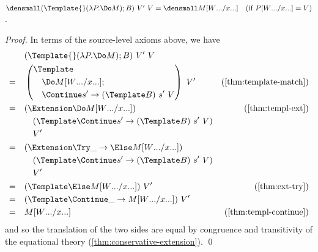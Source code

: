 \begin{lemma}
  \label{thm:template-do-match}

  $\den{(\Template{} (\lambda P. \Do M); B) ~ V' ~ V} = \den{M\subst{\many{x}}{\many{W}}}
  \quad (\text{if } P\subst{\many{x}}{\many{W}} = V)$.
\end{lemma}
\begin{proof}
  In terms of the source-level axioms above, we have
  \begin{align*}
    &\quad
    (\Template{} (\lambda P. \Do M); B) ~ V' ~ V
    \\
    =&\quad
    \left(
      \begin{aligned}
        &\Template \\
        &\quad \Do M\subst{\many{x}}{\many{W}}; \\
        &\quad \Continue s' \to (\Template B) ~ s' ~ V
      \end{aligned}
    \right)
    ~ V'
    &(\cref{thm:template-match})
    \\
    =&\quad
    \begin{aligned}[t]
      &(\Extension \Do M\subst{\many{x}}{\many{W}}) \\
      &\quad (\Template \Continue s' \to (\Template B) ~ s' ~ V) \\
      &\quad V'
    \end{aligned}
    &(\cref{thm:templ-ext})
    \\
    =&\quad
    \begin{aligned}[t]
      &(\Extension \Try \_ \to \Else M\subst{\many{x}}{\many{W}}) \\
      &\quad (\Template \Continue s' \to (\Template B) ~ s' ~ V) \\
      &\quad V'
    \end{aligned}
    \\
    =&\quad
    (\Template \Else M\subst{\many{x}}{\many{W}})
    ~ V'
    &(\cref{thm:ext-try})
    \\
    =&\quad
    (\Template \Continue \_ \to  M\subst{\many{x}}{\many{W}})
    ~ V'
    \\
    =&\quad
    M\subst{\many{x}}{\many{W}}    
    &(\cref{thm:templ-continue})
  \end{align*}
  and so the translation of the two sides are equal by congruence and transitivity of the equational theory (\cref{thm:conservative-extension}).
  \qed

\end{proof}
